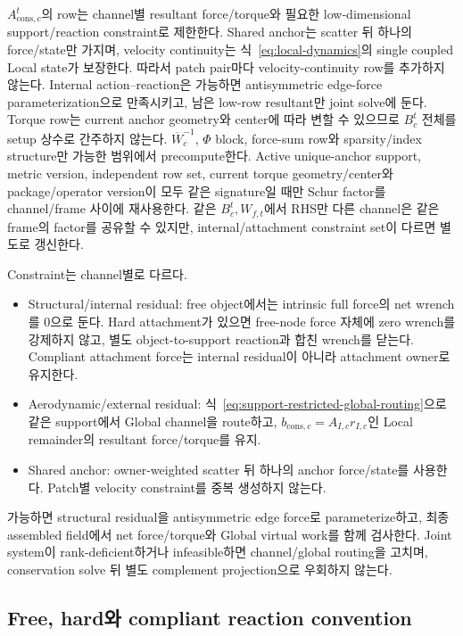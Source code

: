 \documentclass[11pt,a4paper]{article}
\begin{document}
\(A_{\mathrm{cons},c}^t\)의 row는 channel별 resultant force/torque와 필요한 low-dimensional
support/reaction constraint로 제한한다. Shared anchor는 scatter 뒤 하나의 force/state만 가지며,
velocity continuity는 식~\eqref{eq:local-dynamics}의 single coupled Local state가 보장한다.
따라서 patch pair마다 velocity-continuity row를 추가하지 않는다.
Internal action--reaction은 가능하면 antisymmetric edge-force parameterization으로 만족시키고,
남은 low-row resultant만 joint solve에 둔다.
Torque row는 current anchor geometry와 center에 따라 변할 수 있으므로 \(B_c^t\) 전체를 setup 상수로 간주하지 않는다.
\(\overline W_c^{-1}\), \(\Phi\) block, force-sum row와 sparsity/index structure만 가능한 범위에서 precompute한다.
Active unique-anchor support, metric version, independent row set, current torque geometry/center와
package/operator version이 모두 같은 signature일 때만 Schur factor를 channel/frame 사이에 재사용한다.
같은 \(B_c^t,W_{f,t}\)에서 RHS만 다른 channel은 같은 frame의 factor를 공유할 수 있지만,
internal/attachment constraint set이 다르면 별도로 갱신한다.

Constraint는 channel별로 다르다.

\begin{itemize}[leftmargin=1.5em]
  \item Structural/internal residual:
  free object에서는 intrinsic full force의 net wrench를 0으로 둔다.
  Hard attachment가 있으면 free-node force 자체에 zero wrench를 강제하지 않고,
  별도 object-to-support reaction과 합친 wrench를 닫는다.
  Compliant attachment force는 internal residual이 아니라 attachment owner로 유지한다.
  \item Aerodynamic/external residual:
  식~\eqref{eq:support-restricted-global-routing}으로 같은 support에서 Global channel을 route하고,
  \(b_{\mathrm{cons},c}=A_{I,c}r_{I,c}\)인 Local remainder의 resultant force/torque를 유지.
  \item Shared anchor:
  owner-weighted scatter 뒤 하나의 anchor force/state를 사용한다.
  Patch별 velocity constraint를 중복 생성하지 않는다.
\end{itemize}

가능하면 structural residual을 antisymmetric edge force로 parameterize하고,
최종 assembled field에서 net force/torque와 Global virtual work를 함께 검사한다.
Joint system이 rank-deficient하거나 infeasible하면 channel/global routing을 고치며,
conservation solve 뒤 별도 complement projection으로 우회하지 않는다.

\subsection*{Free, hard와 compliant reaction convention}
\end{document}
